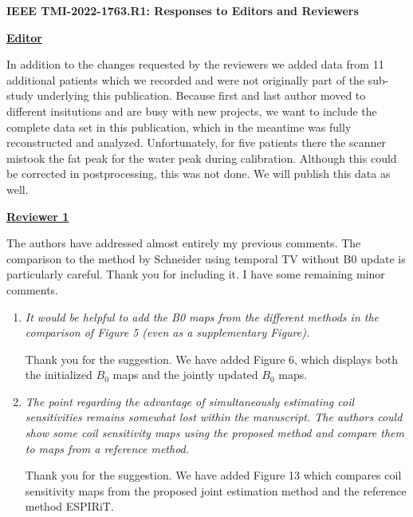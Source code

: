 \documentclass[a4paper,11pt]{report}
\begin{document}
	
\begin{center}
	{\large\textbf{IEEE TMI-2022-1763.R1: Responses to Editors and Reviewers}}
\end{center}


\noindent \underline{\textbf{Editor}}

\noindent In addition to the changes requested by the reviewers we added
data from 11 additional patients which we recorded and were not originally
part of the sub-study underlying this publication. Because first and last
author moved to different insitutions and are busy with new projects, 
we want to include the complete data set in this publication, which in
the meantime was fully reconstructed and analyzed.  Unfortunately, for
five patients there the scanner mistook the fat peak for the water
peak during calibration. Although this could be corrected in postprocessing,
this was not done. We will publish this data as well.

\vspace{2em}


\noindent \underline{\textbf{Reviewer 1}}

\noindent The authors have addressed almost entirely my previous comments. The comparison to the method by Schneider using temporal TV without B0 update is particularly careful. Thank you for including it. I have some remaining minor comments.

\begin{enumerate}
	\item \textit{It would be helpful to add the B0 maps from the different methods in the comparison of Figure 5 (even as a supplementary Figure).}

\hspace{1em} Thank you for the suggestion. 
We have added Figure 6, 
which displays both the initialized $B_0$ maps and the jointly updated $B_0$ maps.

	\item \textit{The point regarding the advantage of simultaneously estimating coil sensitivities remains somewhat lost within the manuscript. The authors could show some coil sensitivity maps using the proposed method and compare them to  maps from a reference method.}

\hspace{1em} Thank you for the suggestion. 
We have added Figure 13 which compares coil sensitivity maps from 
the proposed joint estimation method and the reference method ESPIRiT.

\end{enumerate}
\end{document}
